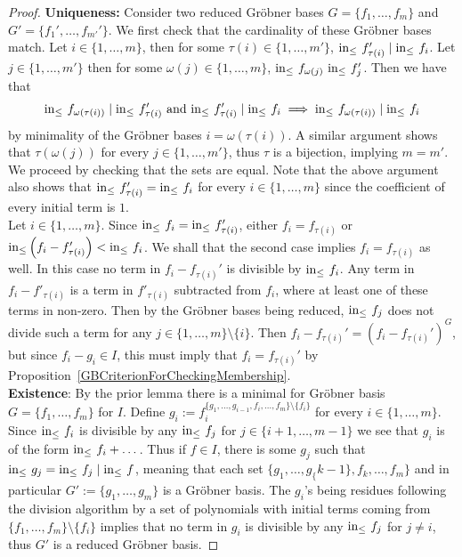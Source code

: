 \begin{proof}
    \textbf{Uniqueness:} Consider two reduced Gröbner bases $G=\{f_1,\dots,f_m\}$ and $G' = \{f_1',\dots,f_{m'}'\}$. We first check that the cardinality of these Gröbner bases match. Let $i\in\{1,\dots,m\}$, then for some $\tau(i)\in\{1,\dots,m'\}$, $\mathrm{in}_\leq\ f'_{\tau(i)}\mid \mathrm{in}_\leq\ f_i$. Let $j\in \{1,\dots,m'\}$ then for some $\omega(j)\in \{1,\dots,m\}$, $\mathrm{in}_\leq \ f_{\omega(j)} \ \mathrm{in}_\leq\ f'_{j}$. Then we have that  
    $$\inn\ f_{\omega(\tau(i))}\mid \inn\ f'_{\tau(i)} \text{ and }    \inn\ f'_{\tau(i)} \mid \inn\ f_{i} \implies \inn\ f_{\omega(\tau(i))} \mid \inn\ f_i$$
    by minimality of the Gröbner bases $i = \omega(\tau(i))$. A similar argument shows that $\tau(\omega(j))$ for every $j\in\{1,\dots,m'\}$, thus $\tau$ is a bijection, implying $m=m'$. We proceed by checking that the sets are equal. Note that the above argument also shows that $\mathrm{in}_\leq\ f'_{\tau(i)} = \mathrm{in}_\leq\ f_i$ for every $i\in\{1,\dots,m\}$ since the coefficient of every initial term is $1$.\\
    Let $i\in\{1,\dots,m\}$. Since $\mathrm{in}_\leq\ f_i=\mathrm{in}_\leq\ f_{\tau(i)}'$, either $f_i=f_{\tau(i)}$ or $\mathrm{in}_\leq\left( f_i-f_{\tau(i)}'\right)<\mathrm{in}_\leq\ f_i$. We shall that the second case implies $f_i=f_{\tau(i)}$ as well. In this case no term in $f_i-f_{\tau(i)}'$ is divisible by $\mathrm{in}_\leq\ f_i$. Any term in $f_i-f'_{\tau(i)}$ is a term in $f'_{\tau(i)}$ subtracted from $f_i$, where at least one of these terms in non-zero. Then by the Gröbner bases being reduced, $\mathrm{in}_\leq\ f_j$ does not divide such a term for any $j\in\{1,\dots,m\}\setminus\{i\}$. Then $f_i-f_{\tau(i)}' = \left(f_i-f_{\tau(i)}'\right)^G$, but since $f_i-g_i \in I$, this must imply that $f_i=f_{\tau(i)}'$ by Proposition~\ref{GBCriterionForCheckingMembership}.\\ 
    \textbf{Existence}:
    By the prior lemma there is a minimal for Gröbner basis $G=\{f_1,\dots,f_m\}$ for $I$. Define $g_i := f_i^{\{g_1,\dots,g_{i-1},f_i,\dots,f_m\}\setminus\{f_i\}}$ for every $i\in\{1,\dots,m\}$. Since $\mathrm{in}_\leq\ f_i$ is divisible by any $\mathrm{in}_\leq\ f_j$ for $j\in\{i+1,\dots,m-1\}$ we see that $g_i$ is of the form $\mathrm{in}_\leq\ f_i+\dots$. Thus if $f\in I$, there is some $g_j$ such that $\inn\ g_j = \inn\ f_j\mid \inn\ f$, meaning that each set $\{g_1,\dots,g_\{k-1\},f_k,\dots,f_m\}$ and in particular $G' := \{g_1,\dots,g_m\}$ is a Gröbner basis. The $g_i$'s being residues following the division algorithm by a set of polynomials with initial terms coming from $\{f_1,\dots,f_m\}\setminus \{f_i\}$ implies that no term in $g_i$ is divisible by any $\mathrm{in}_\leq\ f_j$ for $j\neq i$, thus $G'$ is a reduced Gröbner basis.    
\end{proof}
